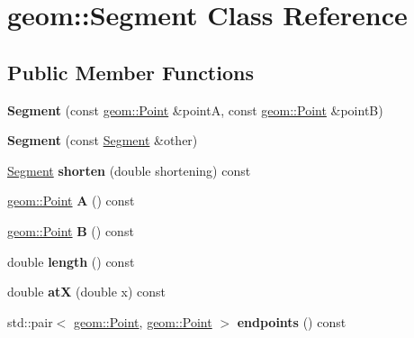 \hypertarget{classgeom_1_1Segment}{}\section{geom\+:\+:Segment Class Reference}
\label{classgeom_1_1Segment}
\subsection*{Public Member Functions}
\begin{DoxyCompactItemize}
\item 
{\bfseries Segment} (const \hyperlink{classgeom_1_1Point}{geom\+::\+Point} \&pointA, const \hyperlink{classgeom_1_1Point}{geom\+::\+Point} \&pointB)\hypertarget{classgeom_1_1Segment_a7afab60778a11d22b0ca74b0c01ff098}{}\label{classgeom_1_1Segment_a7afab60778a11d22b0ca74b0c01ff098}

\item 
{\bfseries Segment} (const \hyperlink{classgeom_1_1Segment}{Segment} \&other)\hypertarget{classgeom_1_1Segment_aada8e051bd6213570fe1d680f8ec7420}{}\label{classgeom_1_1Segment_aada8e051bd6213570fe1d680f8ec7420}

\item 
\hyperlink{classgeom_1_1Segment}{Segment} {\bfseries shorten} (double shortening) const \hypertarget{classgeom_1_1Segment_a08680353e6008fbdc3939189d4cde8b2}{}\label{classgeom_1_1Segment_a08680353e6008fbdc3939189d4cde8b2}

\item 
\hyperlink{classgeom_1_1Point}{geom\+::\+Point} {\bfseries A} () const \hypertarget{classgeom_1_1Segment_a9a9ee10e084b05bd59f90023a4735eb3}{}\label{classgeom_1_1Segment_a9a9ee10e084b05bd59f90023a4735eb3}

\item 
\hyperlink{classgeom_1_1Point}{geom\+::\+Point} {\bfseries B} () const \hypertarget{classgeom_1_1Segment_a5809c9fda94617de8ecea35025aa8974}{}\label{classgeom_1_1Segment_a5809c9fda94617de8ecea35025aa8974}

\item 
double {\bfseries length} () const \hypertarget{classgeom_1_1Segment_aa8042523ba892e201a4aeb17ab1588e9}{}\label{classgeom_1_1Segment_aa8042523ba892e201a4aeb17ab1588e9}

\item 
double {\bfseries atX} (double x) const \hypertarget{classgeom_1_1Segment_a012bcce2ef9e5d4026ec7da5323e3119}{}\label{classgeom_1_1Segment_a012bcce2ef9e5d4026ec7da5323e3119}

\item 
std\+::pair$<$ \hyperlink{classgeom_1_1Point}{geom\+::\+Point}, \hyperlink{classgeom_1_1Point}{geom\+::\+Point} $>$ {\bfseries endpoints} () const \hypertarget{classgeom_1_1Segment_a3ed550845c0003774f6caee58c2a0d1d}{}\label{classgeom_1_1Segment_a3ed550845c0003774f6caee58c2a0d1d}

\end{DoxyCompactItemize}

